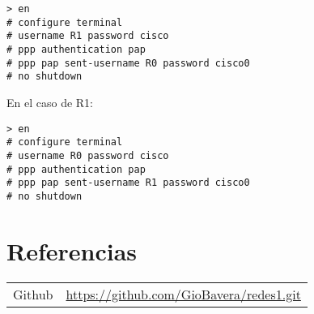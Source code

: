 \documentclass{article}
\begin{document}
\begin{verbatim}
> en
# configure terminal 
# username R1 password cisco
# ppp authentication pap
# ppp pap sent-username R0 password cisco0
# no shutdown
\end{verbatim}

En el caso de R1: 

\begin{verbatim}
> en
# configure terminal 
# username R0 password cisco
# ppp authentication pap
# ppp pap sent-username R1 password cisco0
# no shutdown
\end{verbatim}

\section{Referencias}
\begin{tabular}{ll}
Github         & \url{https://github.com/GioBavera/redes1.git} \\
\end{tabular}
\end{document}
